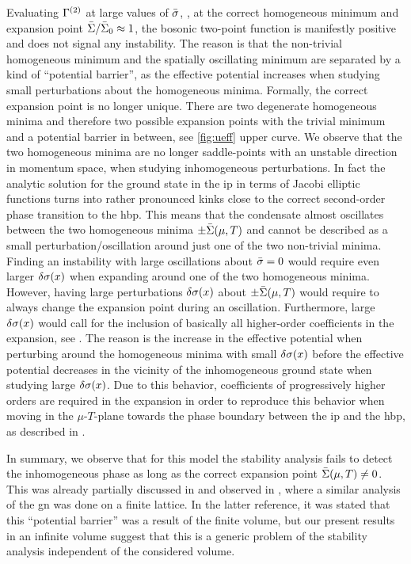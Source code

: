 Evaluating $\Gamma^{(2)}$ at large values of $\bar{\sigma}$, \eg{}, at the correct homogeneous minimum and expansion point $\bar{\Sigma}/\bar{\Sigma}_0 \approx 1$, the bosonic two-point function is manifestly positive and does not signal any instability.
The reason is that the non-trivial homogeneous minimum and the spatially oscillating minimum are separated by a kind of ``potential barrier'', as the effective potential increases when studying small perturbations about the homogeneous minima.
Formally, the correct expansion point is no longer unique.
There are two degenerate homogeneous minima and therefore two possible expansion points with the trivial minimum and a potential barrier in between, see \cref{fig:ueff} upper curve.
We observe that the two homogeneous minima are no longer saddle-points with an unstable direction in momentum space, when studying inhomogeneous perturbations.
In fact the analytic solution for the ground state in the \gls{ip} in terms of Jacobi elliptic functions turns into rather pronounced kinks close to the correct second-order phase transition to the \gls{hbp}.
This means that the condensate almost oscillates between the two homogeneous minima $\pm \bar{\Sigma} ( \mu, T )$ and cannot be described as a small perturbation/oscillation around just one of the two non-trivial minima.
Finding an instability with large oscillations about ${\bar{\sigma} = 0}$ would require even larger $\delta \sigma(x)$ when expanding around one of the two homogeneous minima.
However, having large perturbations $\delta \sigma(x)$ about $\pm \bar{\Sigma}(\mu,T)$ would require to always change the expansion point during an oscillation.
Furthermore, large $\delta \sigma(x)$ would call for the inclusion of basically all higher-order coefficients in the expansion, see .
The reason is the increase in the effective potential when perturbing around the homogeneous minima with small $\delta \sigma(x)$ before the effective potential decreases in the vicinity of the inhomogeneous ground state when studying large $\delta \sigma(x)$. Due to this behavior, coefficients of progressively higher orders are required in the expansion in order to reproduce this behavior when moving in the $\mu$-$T$-plane towards the phase boundary between the \gls{ip} and the \gls{hbp}, as described in .

In summary, we observe that for this model the stability analysis fails to detect the inhomogeneous phase as long as the correct expansion point $\bar{\Sigma} ( \mu, T ) \neq 0$.
This was already partially discussed in  and observed in , where a similar analysis of the \gls{gn} was done on a finite lattice.
In the latter reference, it was stated that this ``potential barrier'' was a result of the finite volume, but our present results in an infinite volume suggest that this is a generic problem of the stability analysis independent of the considered volume.

